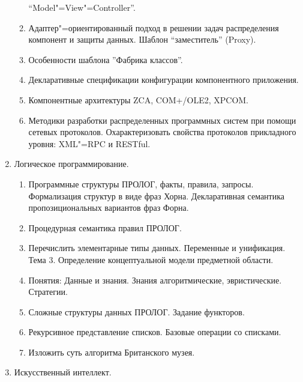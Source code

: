 \documentclass[final,a4paper,12pt]{report}
\begin{document}
\begin{enumerate}
\begin{enumerate}
    “Model"=View"=Controller”.
  \item Адаптер"=ориентированный подход в решении задач распределения
    компонент и защиты данных. Шаблон “заместитель” (Proxy).
  \item Особенности шаблона ”Фабрика классов”.
  \item Декларативные спецификации конфигурации компонентного
    приложения.
  \item Компонентные архитектуры ZCA, COM+/OLE2, XPCOM.
  \item Методики разработки распределенных программных систем при
    помощи сетевых протоколов.  Охарактеризовать свойства протоколов
    прикладного уровня: XML"=RPC и RESTful.
  \end{enumerate}
\item Логическое программирование.
  \begin{enumerate}
  \item Программные структуры ПРОЛОГ, факты, правила,
    запросы. Формализация структур в виде фраз Хорна.  Декларативная
    семантика пропозициональных вариантов фраз Форна.
  \item Процедурная семантика правил ПРОЛОГ.
  \item Перечислить элементарные типы данных.  Переменные и
    унификация.  Тема 3.  Определение концептуальной модели предметной
    области.
  \item Понятия: Данные и знания. Знания алгоритмические,
    эвристические. Стратегии.
  \item Сложные структуры данных ПРОЛОГ. Задание функторов.
  \item Рекурсивное представление списков. Базовые операции со
    списками.
  \item Изложить суть алгоритма Британского музея.
  \end{enumerate}
\item Искусственный интеллект.


\end{enumerate}
\end{document}
